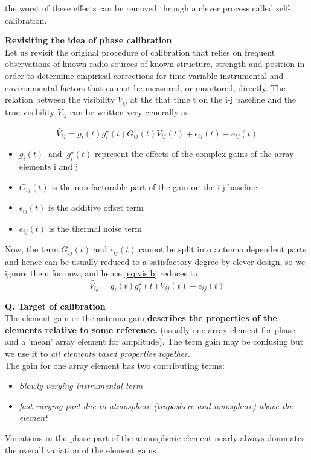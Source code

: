 \documentclass[10pt]{report}
\newcommand{\tbf}[1]{\textbf{#1}}
\newcommand{\tit}[1]{\textit{#1}}
\begin{document}
the worst of these effects can be removed through a clever process called self-calibration.
  
\tbf{Revisiting the idea of phase calibration}\\

Let us revisit the original procedure of calibration that relies on frequent observations of known radio sources of known structure, strength and position in order to determine empirical corrections for time variable instrumental and environmental factors that cannot be measured, or monitored, directly. The relation between the visibility $\tilde{V_{ij}}$ at the that time t on the i-j baseline and the true visibility $V_{ij}$ can be written very generally as 

\begin{equation}\label{eq:visib}
\tilde{V_{ij}}=g_i(t)g^\star _i(t)G_{ij}(t)V_{ij}(t)+\epsilon_{ij}(t)+e_{ij}(t)
\end{equation}
\begin{itemize}
\item $g_i(t)\;\; \text{and} \;\; g^\star _i(t)$ represent the effects of the complex gains of the array elements i and j
\item $G_{ij}(t)$ is the non factorable part of the gain on the i-j baseline
\item $\epsilon_{ij}(t)$ is the additive offset term
\item $e_{ij}(t)$ is the thermal noise term
\end{itemize}
Now, the term $G_{ij}(t)$ and $\epsilon_{ij}(t)$ cannot be split into antenna dependent parts and hence can be usually reduced to a satisfactory degree by clever design, so we ignore them for now, and hence \eqref{eq:visib} reduces to 
\begin{equation}
\tilde{V_{ij}}=g_i(t)g^\star _i(t)V_{ij}(t)+e_{ij}(t)
\end{equation}

\tbf{Q. Target of calibration}\\

The element gain or the antenna gain \tbf{describes the properties of the elements relative to some reference.} (usually one array element for phase and a 'mean' array element for amplitude). The term gain may be confusing but we use it to \tit{all elements based properties together}. \\

The gain for one array element has two contributing terms:
\begin{itemize}
\item \tit{Slowly varying instrumental term}
\item \tit{fast varying part due to atmosphere (troposhere and ionosphere) above the element}
\end{itemize}
Variations in the phase part of the atmospheric element nearly always dominates the overall variation of the element gains.\\
\end{document}
